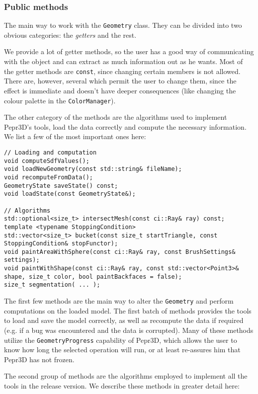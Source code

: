 \subsubsection{Public methods}

The main way to work with the \texttt{Geometry} class. They can be divided into two obvious categories: the \textit{getters} and the rest.

We provide a lot of getter methods, so the user has a good way of communicating with the object and can extract as much information out as he wants. Most of the getter methods are \texttt{const}, since changing certain members is not allowed. There are, however, several which permit the user to change them, since the effect is immediate and doesn't have deeper consequences (like changing the colour palette in the \texttt{ColorManager}).

The other category of the methods are the algorithms used to implement Pepr3D's tools, load the data correctly and compute the necessary information. We list a few of the most important ones here:

\begin{lstlisting}
// Loading and computation
void computeSdfValues();
void loadNewGeometry(const std::string& fileName);
void recomputeFromData();
GeometryState saveState() const;
void loadState(const GeometryState&);

// Algorithms
std::optional<size_t> intersectMesh(const ci::Ray& ray) const;
template <typename StoppingCondition>
std::vector<size_t> bucket(const size_t startTriangle, const StoppingCondition& stopFunctor);
void paintAreaWithSphere(const ci::Ray& ray, const BrushSettings& settings);
void paintWithShape(const ci::Ray& ray, const std::vector<Point3>& shape, size_t color, bool paintBackfaces = false);
size_t segmentation( ... );
\end{lstlisting}

The first few methods are the main way to alter the \texttt{Geometry} and perform computations on the loaded model. The first batch of methods provides the tools to load and save the model correctly, as well as recompute the data if required (e.g. if a bug was encountered and the data is corrupted). Many of these methods utilize the \texttt{GeometryProgress} capability of Pepr3D, which allows the user to know how long the selected operation will run, or at least re-assures him that Pepr3D has not frozen.

The second group of methods are the algorithms employed to implement all the tools in the release version. We describe these methods in greater detail here:

